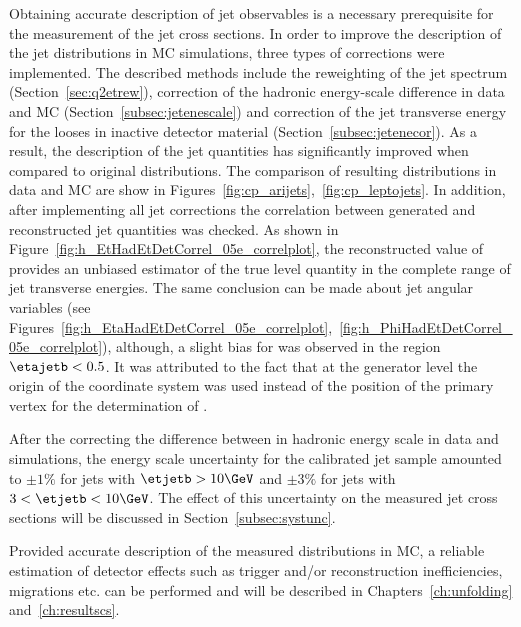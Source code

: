 %
Obtaining accurate description of jet observables is a necessary prerequisite for the measurement of the jet cross sections. In order to improve the description of the jet distributions in MC simulations, three types of corrections were implemented. The described methods include the reweighting of the jet spectrum (Section~\ref{sec:q2etrew}), correction of the hadronic energy-scale difference in data and MC (Section~\ref{subsec:jetenescale}) and correction of the jet transverse energy for the looses in inactive detector material (Section~\ref{subsec:jetenecor}). As a result, the description of the jet quantities has significantly improved when compared to original distributions. The comparison of resulting distributions in data and MC are show in Figures~\ref{fig:cp_arijets},~\ref{fig:cp_leptojets}. In addition, after implementing all jet corrections the correlation between generated and reconstructed jet quantities was checked. As shown in Figure~\ref{fig:h_EtHadEtDetCorrel_05e_correlplot}, the reconstructed value of \etjetb provides an unbiased estimator of the true level quantity in the complete range of jet transverse energies. The same conclusion can be made about jet angular variables (see Figures~\ref{fig:h_EtaHadEtDetCorrel_05e_correlplot},~\ref{fig:h_PhiHadEtDetCorrel_05e_correlplot}), although, a slight bias for \etajetb was observed in the region $\etajetb < 0.5$. It was attributed to the fact that at the generator level the origin of the \zeus coordinate system was used instead of the position of the primary vertex for the determination of \etajetb.

After the correcting the difference between in hadronic energy scale in data and simulations, the energy scale uncertainty for the calibrated jet sample amounted to $\pm 1\%$ for jets with $\etjetb > 10 \GeV$  and $\pm 3\%$ for jets with $3 < \etjetb < 10 \GeV$. The effect of this uncertainty on the measured jet cross sections will be discussed in Section~\ref{subsec:systunc}.

Provided accurate description of the measured distributions in MC, a reliable estimation of detector effects such as trigger and/or reconstruction inefficiencies, migrations etc. can be performed and will be described in Chapters~\ref{ch:unfolding} and~\ref{ch:resultscs}.